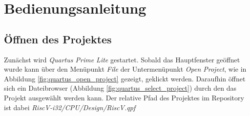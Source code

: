 \chapter{Bedienungsanleitung}

    \section{Öffnen des Projektes}
        Zunächst wird \textit{Quartus Prime Lite} gestartet.
        Sobald das Hauptfenster geöffnet wurde kann über den Menüpunkt \textit{File}
        der Untermenüpunkt \textit{Open Project}, wie in Abbildung \ref{fig:quartus_open_project} gezeigt,
        geklickt werden. Daraufhin öffnet sich ein Dateibrowser (Abbildung \ref{fig:quartus_select_project})
        durch den das Projekt ausgewählt werden kann.
        Der relative Pfad des Projektes im Repository ist dabei \textit{RiscV-i32/CPU/Design/RiscV.qpf}
        
